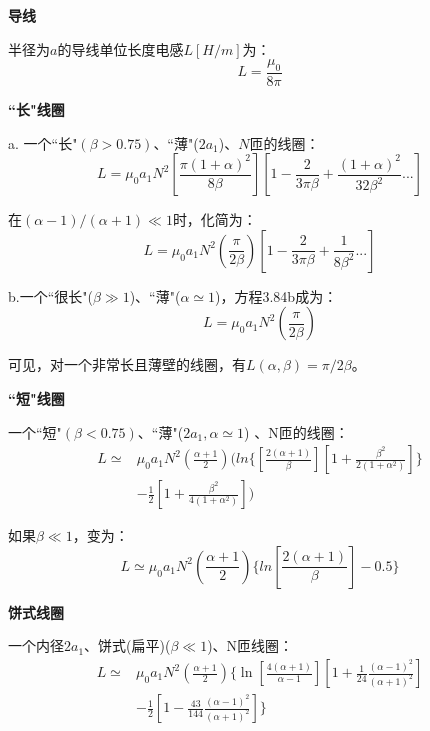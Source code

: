 \textbf{导线}  
  
  半径为$a$的导线单位长度电感$L[H/m]$为：
  \begin{equation}
         L=\frac{\mu_0}{8\pi}%
  \end{equation}
  
\textbf{``长"线圈} 
  
  a. 一个``长"$(β>0.75)$、``薄"($2a_1$)、$N$匝的线圈：
\begin{equation}
  L=\mu_0a_1N^2\left[\frac{\pi(1+\alpha)^2}{8\beta}\right]\left[1-\frac{2}{3\pi\beta}+\frac{(1+\alpha)^2}{32\beta^2}...\right]%
\end{equation}

在$(\alpha−1)/(\alpha+1)\ll 1$时，化简为：
\begin{equation*}
  L=\mu_0a_1N^2\left(\frac{\pi}{2\beta}\right)\left[1-\frac{2}{3\pi\beta}+\frac{1}{8\beta^2}...\right] \tag{3.84b}%
\end{equation*}

b.一个``很长"($\beta\gg 1$)、``薄"($\alpha \simeq 1$)，方程3.84b成为：
\begin{equation*}
  L=\mu_0a_1N^2(\frac{\pi}{2\beta}) \tag{3.84c}%
\end{equation*}

可见，对一个非常长且薄壁的线圈，有$L(\alpha,\beta)=\pi/2\beta$。

\textbf{``短"线圈}

 一个``短"$(\beta<0.75)$、``薄"($2a_1,\alpha\simeq 1$) 、N匝的线圈：
  \begin{equation}
  \begin{split}
L\simeq&\mu_0a_1N^2(\frac{\alpha+1}{2})(ln\{[\frac{2(\alpha+1)}{\beta}][1+\frac{\beta^2}{2(1+\alpha^2)}]\}\\
&-\frac{1}{2}[1+\frac{\beta^2}{4(1+\alpha^2)}])%
  \end{split}
  \end{equation}
  
  如果$\beta \ll 1$，变为：
  \begin{equation*}
L\simeq\mu_0a_1N^2(\frac{\alpha+1}{2})\{ln[\frac{2(\alpha+1)}{\beta}]-0.5\} \tag{3.85'}%
\end{equation*}

\textbf{饼式线圈}

  一个内径$2a_1$、饼式(扁平)($\beta\ll 1$)、N匝线圈：
  \begin{equation}
  \begin{split}
L\simeq & \mu_0a_1N^2(\frac{\alpha+1}{2})\{\ln[\frac{4(\alpha+1)}{\alpha-1}][1+\frac{1}{24}\frac{(\alpha-1)^2}{(\alpha+1)^2}]\\
&-\frac{1}{2}[1-\frac{43}{144}\frac{(\alpha-1)^2}{(\alpha+1)^2}]\}%
  \end{split}
\end{equation}

